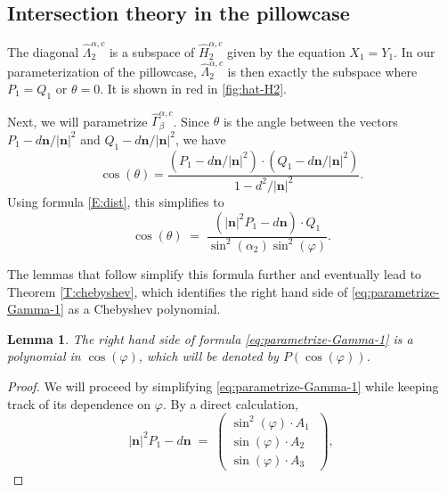 \documentclass[11pt,reqno]{amsart}
\newtheorem{lemma}[theorem]{Lemma}
\theoremstyle{definition}
\renewcommand{\phi}{\varphi}
\newcommand{\n}{\mathbf n}
\begin{document}
\begin{sloppypar}

\subsection{Intersection theory in the pillowcase}
The diagonal $\widehat{\Lambda}_2^{\alpha, c}$ is a subspace of $\widehat{H}_2^{\alpha, c}$ given by the equation $X_1 = Y_1$. In our parameterization of the pillowcase, $\widehat{\Lambda}_2^{\alpha, c}$ is then exactly the subspace where $P_1 = Q_1$ or $\theta = 0$. It is shown in red in \autoref{fig:hat-H2}. 

Next, we will parametrize $\widehat{\Gamma}_{\beta}^{\alpha,c}$. Since $\theta$ is the angle between the vectors $P_1 - d\n/|\n|^2$ and $Q_1 - d\n/|\n|^2$, we have 
\[
\cos(\theta) = \frac{(P_1 - d\n/|\n|^2) \cdot (Q_1 - d\n/|\n|^2)}{1 - d^2/|\n |^2}.
\]	
Using formula \eqref{E:dist}, this simplifies to 
\begin{equation}\label{eq:parametrize-Gamma-1}
\cos(\theta)\; =\; \frac{(|\n|^2 P_1 - d\n) \cdot Q_1}{\sin^2(\alpha_2) \sin^2(\phi)}.
\end{equation}

\smallskip\noindent
The lemmas that follow simplify this formula further and eventually lead to Theorem \ref{T:chebyshev}, which identifies the right hand side of \eqref{eq:parametrize-Gamma-1} as a Chebyshev polynomial. 

\begin{lemma}\label{L:one}
The right hand side of formula \eqref{eq:parametrize-Gamma-1} is a polynomial in $\cos (\phi)$, which will be denoted by $P(\cos(\phi))$.
\end{lemma}

\begin{proof}
We will proceed by simplifying \eqref{eq:parametrize-Gamma-1} while keeping track of its dependence on $\phi$. By a direct calculation,
\begin{equation}\label{E:P}
|\n|^2 P_1 - d \n\; =\; \begin{pmatrix}
			\sin^2(\phi) \cdot A_1\; \\
			\sin(\phi) \cdot A_2 \\
			\sin(\phi) \cdot A_3
\end{pmatrix},
\end{equation}


\end{proof}
\end{sloppypar}
\end{document}

